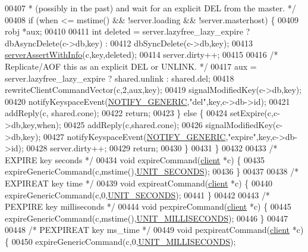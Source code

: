 \begin{DoxyCode}
{{{{{00407 \textcolor{comment}{     * (possibly in the past) and wait for an explicit DEL from the master. */}
00408     \textcolor{keywordflow}{if} (when <= mstime() && !server.loading && !server.masterhost) \{
00409         robj *aux;
00410 
00411         \textcolor{keywordtype}{int} deleted = server.lazyfree\_lazy\_expire ? dbAsyncDelete(c->db,key) :
00412                                                     dbSyncDelete(c->db,key);
00413         \hyperlink{server_8h_a7308f76cbff9a8d3797fe78190b91282}{serverAssertWithInfo}(c,key,deleted);
00414         server.dirty++;
00415 
00416         \textcolor{comment}{/* Replicate/AOF this as an explicit DEL or UNLINK. */}
00417         aux = server.lazyfree\_lazy\_expire ? shared.unlink : shared.del;
00418         rewriteClientCommandVector(c,2,aux,key);
00419         signalModifiedKey(c->db,key);
00420         notifyKeyspaceEvent(\hyperlink{server_8h_a9fa53dd1068e62365f3964ad3479eec2}{NOTIFY\_GENERIC},\textcolor{stringliteral}{"del"},key,c->db->id);
00421         addReply(c, shared.cone);
00422         \textcolor{keywordflow}{return};
00423     \} \textcolor{keywordflow}{else} \{
00424         setExpire(c,c->db,key,when);
00425         addReply(c,shared.cone);
00426         signalModifiedKey(c->db,key);
00427         notifyKeyspaceEvent(\hyperlink{server_8h_a9fa53dd1068e62365f3964ad3479eec2}{NOTIFY\_GENERIC},\textcolor{stringliteral}{"expire"},key,c->db->id);
00428         server.dirty++;
00429         \textcolor{keywordflow}{return};
00430     \}
00431 \}
00432 
00433 \textcolor{comment}{/* EXPIRE key seconds */}
00434 \textcolor{keywordtype}{void} expireCommand(\hyperlink{structclient}{client} *c) \{
00435     expireGenericCommand(c,mstime(),\hyperlink{server_8h_a8553b0a6c729b15594731a0d37b4fb0d}{UNIT\_SECONDS});
00436 \}
00437 
00438 \textcolor{comment}{/* EXPIREAT key time */}
00439 \textcolor{keywordtype}{void} expireatCommand(\hyperlink{structclient}{client} *c) \{
00440     expireGenericCommand(c,0,\hyperlink{server_8h_a8553b0a6c729b15594731a0d37b4fb0d}{UNIT\_SECONDS});
00441 \}
00442 
00443 \textcolor{comment}{/* PEXPIRE key milliseconds */}
00444 \textcolor{keywordtype}{void} pexpireCommand(\hyperlink{structclient}{client} *c) \{
00445     expireGenericCommand(c,mstime(),\hyperlink{server_8h_a259de972533409a75b736bfc799a8e2d}{UNIT\_MILLISECONDS});
00446 \}
00447 
00448 \textcolor{comment}{/* PEXPIREAT key ms\_time */}
00449 \textcolor{keywordtype}{void} pexpireatCommand(\hyperlink{structclient}{client} *c) \{
00450     expireGenericCommand(c,0,\hyperlink{server_8h_a259de972533409a75b736bfc799a8e2d}{UNIT\_MILLISECONDS});
}}}}}
\end{DoxyCode}
